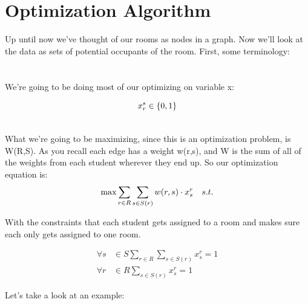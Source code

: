 \documentclass[12pt]{article}
\begin{document}
\section{Optimization Algorithm}

Up until now we've thought of our rooms as nodes in a graph. Now we'll look at the data as sets of potential occupants of the room. First, some terminology:\\

\\
\\ 

\noindent We're going to be doing most of our optimizing on variable x:

\begin{equation*}
\noindent{x_r^s \in \{0, 1\}\\} 
\end{equation*}


\\

What we're going to be maximizing, since this is an optimization problem, is W(R,S). As you recall each edge has a weight w(r,s), and W is the sum of all of the weights from each student wherever they end up. So our optimization equation is:\\

\begin{equation*}
\max\sum_{r\in{R}}\sum_{s\in{S(r)}}w(r,s)\cdot{x_s^r}\quad{s.t.}\\
\end{equation*}

With the constraints that each student gets assigned to a room and makes sure each only gets assigned to one room.

\begin{align*}
\forall{s}&\in{S}\sum_{r\in{R}}\sum_{s\in{S(r)}}x_s^r=1\\
\forall{r}&\in{R}\sum_{s\in{S(r)}}x_s^r=1
\end{align*}

Let's take a look at an example:\\
\end{document}
